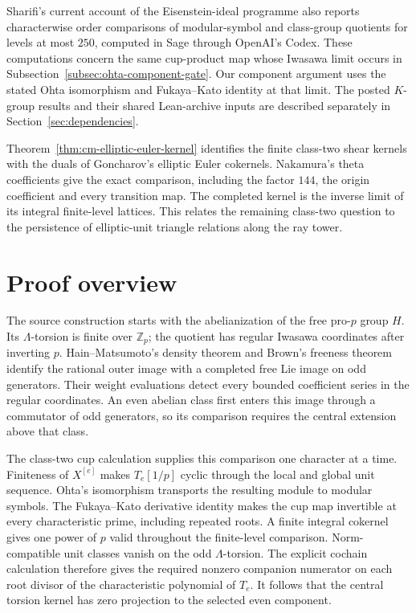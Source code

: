 \documentclass[11pt]{article}
\theoremstyle{definition}\newtheorem{definition}[theorem]{Definition}
\begin{document}
Sharifi's current account of the Eisenstein-ideal programme
\cite[p.~5]{SharifiProgram} also reports characterwise order
comparisons of modular-symbol and class-group quotients for
levels at most $250$, computed in Sage through OpenAI's Codex.
These computations concern the same cup-product map whose
Iwasawa limit occurs in Subsection~\ref{subsec:ohta-component-gate}.
Our component argument uses the stated Ohta isomorphism and
Fukaya--Kato identity at that limit. The posted $K$-group
results and their shared Lean-archive inputs are described
separately in Section~\ref{sec:dependencies}.

Theorem~\ref{thm:cm-elliptic-euler-kernel} identifies the finite
class-two shear kernels with the duals of Goncharov's elliptic Euler
cokernels. Nakamura's theta coefficients give the exact comparison,
including the factor $144$, the origin coefficient and every transition
map. The completed kernel is the inverse limit of its integral
finite-level lattices. This relates the remaining class-two question
to the persistence of elliptic-unit triangle relations along the ray tower.

\section{Proof overview}

The source construction starts with the abelianization of the free pro-$p$ group $H$. Its $\Lambda$-torsion is finite over $\mathbb Z_p$; the quotient has regular Iwasawa coordinates after inverting $p$. Hain--Matsumoto's density theorem and Brown's freeness theorem identify the rational outer image with a completed free Lie image on odd generators. Their weight evaluations detect every bounded coefficient series in the regular coordinates. An even abelian class first enters this image through a commutator of odd generators, so its comparison requires the central extension above that class.

The class-two cup calculation supplies this comparison one character at a time. Finiteness of $X^{[e]}$ makes $T_e[1/p]$ cyclic through the local and global unit sequence. Ohta's isomorphism transports the resulting module to modular symbols. The Fukaya--Kato derivative identity makes the cup map invertible at every characteristic prime, including repeated roots. A finite integral cokernel gives one power of $p$ valid throughout the finite-level comparison. Norm-compatible unit classes vanish on the odd $\Lambda$-torsion. The explicit cochain calculation therefore gives the required nonzero companion numerator on each root divisor of the characteristic polynomial of $T_e$. It follows that the central torsion kernel has zero projection to the selected even component.
\end{document}
